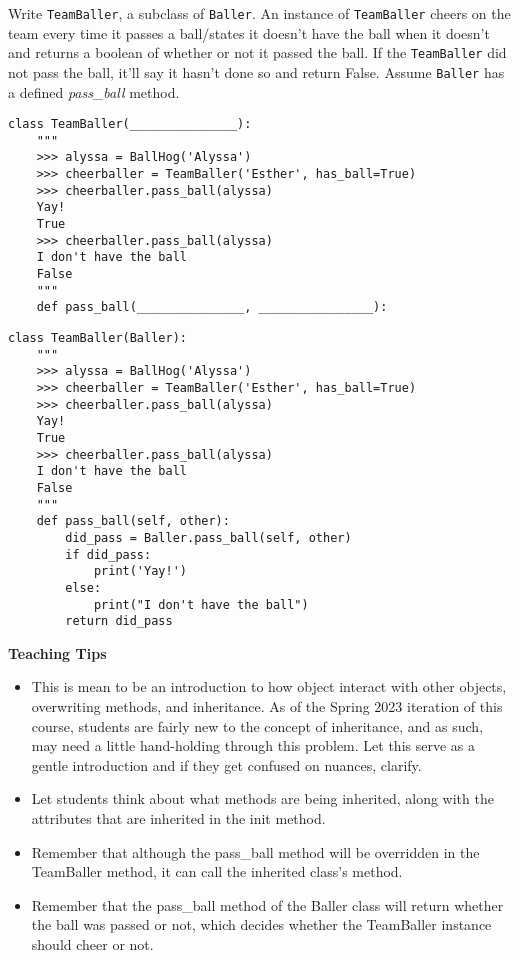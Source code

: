 \begin{blocksection}
\question Write \lstinline$TeamBaller$, a subclass of \lstinline$Baller$. An instance of \lstinline$TeamBaller$ cheers on the team every time it passes a ball/states it doesn't have the ball when it doesn't and returns a boolean of whether or not it passed the ball. If the \lstinline$TeamBaller$ did not pass the ball, it'll say it hasn't done so and return False. Assume \lstinline$Baller$ has a defined \textit{pass\_ball} method.

\ifprintanswers\else
\begin{lstlisting}
class TeamBaller(_______________):
    """
    >>> alyssa = BallHog('Alyssa')
    >>> cheerballer = TeamBaller('Esther', has_ball=True)
    >>> cheerballer.pass_ball(alyssa)
    Yay! 
    True 
    >>> cheerballer.pass_ball(alyssa)
    I don't have the ball 
    False 
    """
    def pass_ball(_______________, ________________):
\end{lstlisting}
\fi

\begin{solution}[1in]
\begin{lstlisting}
class TeamBaller(Baller):
    """
    >>> alyssa = BallHog('Alyssa')
    >>> cheerballer = TeamBaller('Esther', has_ball=True)
    >>> cheerballer.pass_ball(alyssa)
    Yay!
    True
    >>> cheerballer.pass_ball(alyssa)
    I don't have the ball
    False
    """
    def pass_ball(self, other):
        did_pass = Baller.pass_ball(self, other)
        if did_pass:
            print('Yay!')
        else:
            print("I don't have the ball")
        return did_pass
\end{lstlisting}
\end{solution}

\begin{guide}
\begin{blocksection}
\textbf{Teaching Tips}
    \begin{itemize}
    \item This is mean to be an introduction to how object interact with other objects, overwriting methods, and inheritance. As of the Spring 2023 iteration of this course, students are fairly new to the concept of inheritance, and as such, may need a little hand-holding through this problem. Let this serve as a gentle introduction and if they get confused on nuances, clarify.
    \item Let students think about what methods are being inherited, along with the attributes that are inherited in the init method.
    \item Remember that although the pass\_ball method will be overridden in the TeamBaller method, it can call the inherited class's method.
    \item Remember that the pass\_ball method of the Baller class will return whether the ball was passed or not, which decides whether the TeamBaller instance should cheer or not.
    \end{itemize}
\end{blocksection}
\end{guide}

\end{blocksection}